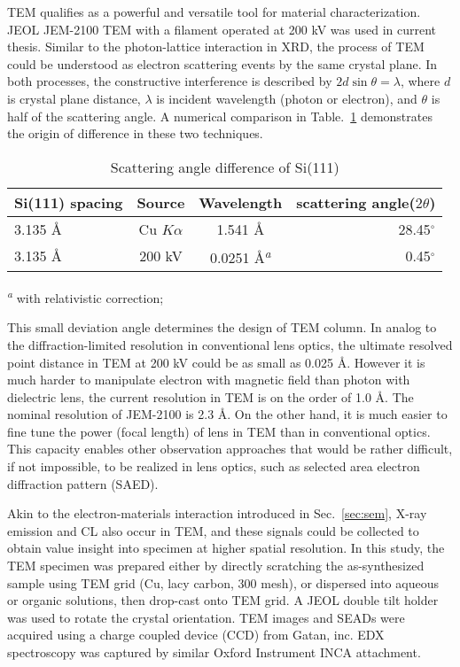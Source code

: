 TEM qualifies as a powerful and versatile tool for material characterization. JEOL JEM-2100 TEM with a  filament operated at 200 kV was used in current thesis. Similar to the photon-lattice interaction in XRD, the process of TEM could be understood as electron scattering events by the same crystal plane. In both processes, the constructive interference is described by $2d\sin\theta = \lambda$, where $d$ is crystal plane distance, $\lambda$ is incident wavelength (photon or electron), and $\theta$ is half of the scattering angle. A numerical comparison in Table.~\ref{tab:ch2tem} demonstrates the origin of difference in these two techniques. 

\begin{table}[htb]
\centering
\caption{Scattering angle difference of Si(111)}\label{tab:ch2tem}
\begin{tabular}{lccr}
\toprule
Si(111) spacing & Source & Wavelength & scattering angle($2\theta$) \\
\midrule
3.135 \AA & Cu $K\alpha$ & 1.541 \AA & 28.45$^\circ$  \\
3.135 \AA & 200 kV & 0.0251 \AA \textsuperscript{\emph{a}}& 0.45$^\circ$  \\
\bottomrule
\end{tabular}

 \textsuperscript{\emph{a}} with relativistic correction;
\end{table}

This small deviation angle determines the design of TEM column. In analog to the diffraction-limited resolution in conventional lens optics, the ultimate resolved point distance in TEM at 200 kV could be as small as 0.025 \AA. However it is much harder to manipulate electron with magnetic field than photon with dielectric lens, the current resolution in TEM is on the order of 1.0 \AA. The nominal resolution of JEM-2100 is 2.3 \AA. On the other hand, it is much easier to fine tune the power (focal length) of lens in TEM than in conventional optics. This capacity enables other observation approaches that would be rather difficult, if not impossible, to be realized in lens optics, such as selected area electron diffraction pattern (SAED). 

Akin to the electron-materials interaction introduced in Sec.~\ref{sec:sem}, X-ray emission and CL also occur in TEM, and these signals could be collected to obtain value insight into specimen at higher spatial resolution. In this study, the TEM specimen was prepared either by directly scratching the as-synthesized sample using TEM grid (Cu, lacy carbon, 300 mesh), or dispersed into aqueous or organic solutions, then drop-cast onto TEM grid. A JEOL double tilt holder was used to rotate the crystal orientation. TEM images and SEADs were acquired using a charge coupled device (CCD) from Gatan, inc. EDX spectroscopy was captured by similar Oxford Instrument INCA attachment. 


